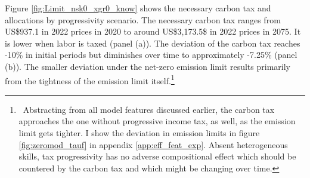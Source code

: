 \begin{figure}[h!!]
\begin{minipage}[]{0.32\textwidth}
\end{minipage}			%
 \end{figure} 
 
 
Figure \ref{fig:Limit_nsk0_xgr0_know} shows the necessary carbon tax and allocations by progressivity scenario. 
The necessary carbon tax ranges from US\$937.1 in 2022 prices in 2020 to around US\$3,173.5\$ in 2022 prices in 2075. It is lower when labor is taxed (panel (a)). The deviation of the carbon tax reaches -10\% in initial periods but diminishes over time to approximately -7.25\% (panel (b)).
The smaller deviation under the net-zero emission limit results primarily from the tightness of the emission limit itself.\footnote{\ Abstracting from all model features discussed earlier, the carbon tax approaches the one without progressive income tax, as well, as the emission limit gets tighter. I show the deviation in emission limits in figure \ref{fig:zeromod_tauf} in appendix \ref{app:eff_feat_exp}. Absent heterogeneous skills, tax progressivity has no adverse compositional effect which should be countered by the carbon tax and which might be changing over time. }



